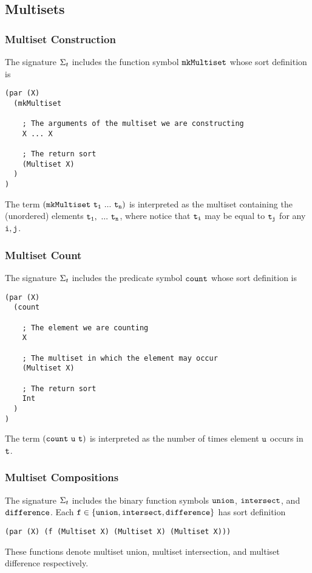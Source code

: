\documentclass[english,a4paper,10pt]{article}
\begin{document}
\subsection{Multisets}

\subsubsection{Multiset Construction}
The signature $\Sigma_{t}$ includes 
the function symbol ${\tt mkMultiset}$ whose sort definition is
\begin{verbatim}
(par (X) 
  (mkMultiset
  
    ; The arguments of the multiset we are constructing
    X ... X
    
    ; The return sort
    (Multiset X)
  )
)
\end{verbatim}
The term $\syntax{(mkMultiset\ t_1\ ...\ t_n)}$ is
interpreted as the multiset containing the (unordered) elements ${\tt t_1,\ ...\ t_n}$, 
where notice that ${\tt t_i}$ may be equal to ${\tt t_j}$ for any ${\tt i},{\tt j}$.

\subsubsection{Multiset Count}
The signature $\Sigma_{t}$ includes 
the predicate symbol ${\tt count}$ whose sort definition is
\begin{verbatim}
(par (X)
  (count 
  
    ; The element we are counting
    X 
    
    ; The multiset in which the element may occur
    (Multiset X)
    
    ; The return sort
    Int
  )
)
\end{verbatim}
The term ${\tt (count\ u\ t)}$ is
interpreted as the number of times element ${\tt u}$ occurs in ${\tt t}$.

\subsubsection{Multiset Compositions}
The signature $\Sigma_{t}$ includes 
the binary function symbols 
${\tt union}$, ${\tt intersect}$, and ${\tt difference}$.
Each ${\tt f} \in \{ {\tt union}, {\tt intersect}, {\tt difference} \}$
has sort definition
\begin{verbatim}
(par (X) (f (Multiset X) (Multiset X) (Multiset X)))
\end{verbatim}
These functions denote multiset union, multiset intersection, and multiset difference
respectively.
\end{document}
